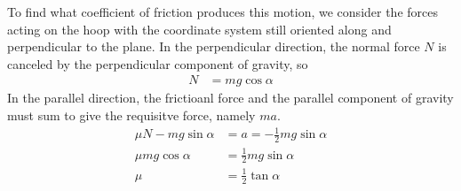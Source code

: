 To find what coefficient of friction produces this motion, we consider the
forces acting on the hoop with the coordinate system still oriented along and
perpendicular to the plane. In the perpendicular direction, the normal force
$N$ is canceled by the perpendicular component of gravity, so
\begin{align*}
    N &= mg\cos α
\end{align*}
In the parallel direction, the frictioanl force and the parallel component of
gravity must sum to give the requisitve force, namely $ma$.
\begin{align*}
    μN - mg\sin α &= a = -\frac 12 mg\sin α \\
    μmg\cos α &= \frac 12 mg\sin α \\
    μ &= \frac 12 \tan α
\end{align*}

